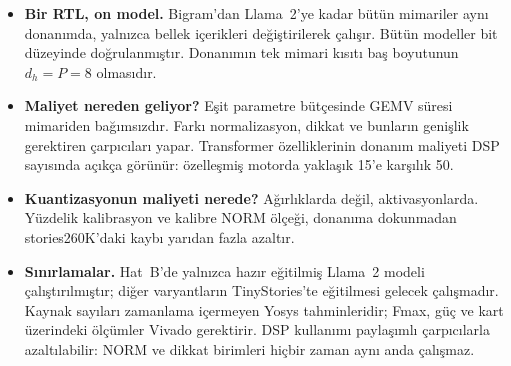 \begin{itemize}
  \item \textbf{Bir RTL, on model.} Bigram'dan Llama~2'ye kadar bütün mimariler aynı donanımda, yalnızca bellek içerikleri değiştirilerek çalışır. Bütün modeller bit düzeyinde doğrulanmıştır. Donanımın tek mimari kısıtı baş boyutunun $d_h = P = 8$ olmasıdır.
  \item \textbf{Maliyet nereden geliyor?} Eşit parametre bütçesinde GEMV süresi mimariden bağımsızdır. Farkı normalizasyon, dikkat ve bunların genişlik gerektiren çarpıcıları yapar. Transformer özelliklerinin donanım maliyeti DSP sayısında açıkça görünür: özelleşmiş motorda yaklaşık 15'e karşılık 50.
  \item \textbf{Kuantizasyonun maliyeti nerede?} Ağırlıklarda değil, aktivasyonlarda. Yüzdelik kalibrasyon ve kalibre NORM ölçeği, donanıma dokunmadan stories260K'daki kaybı yarıdan fazla azaltır.
  \item \textbf{Sınırlamalar.} Hat~B'de yalnızca hazır eğitilmiş Llama~2 modeli çalıştırılmıştır; diğer varyantların TinyStories'te eğitilmesi gelecek çalışmadır. Kaynak sayıları zamanlama içermeyen Yosys tahminleridir; Fmax, güç ve kart üzerindeki ölçümler Vivado gerektirir. DSP kullanımı paylaşımlı çarpıcılarla azaltılabilir: NORM ve dikkat birimleri hiçbir zaman aynı anda çalışmaz.
\end{itemize}
